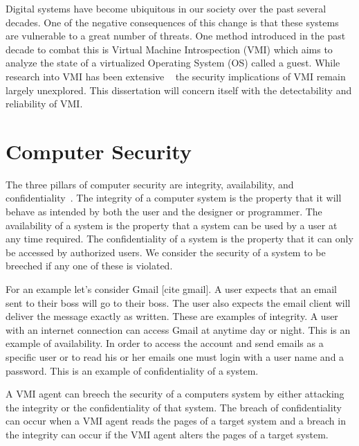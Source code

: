 
Digital systems have become ubiquitous in our society over the past several decades. One of the negative consequences of this change is that these systems are vulnerable to a great number of threats. One method introduced in the past decade to combat this is Virtual Machine Introspection (VMI) which aims to analyze the state of a virtualized Operating System (OS) called a guest. While research into VMI has been extensive ~\cite{bahram_dksm:_2010,pfoh_exploiting_2010,dolan-gavitt_leveraging_2011,dolan-gavitt_virtuoso:_2011,gu_process_2011-1,fu_bridging_2013,garfinkel_virtual_2003,hay_forensics_2008} the security implications of VMI remain largely unexplored. This dissertation will concern itself with the detectability and reliability of VMI.

\section{Computer Security}

The three pillars of computer security are integrity, availability, and confidentiality~\cite{bishop_computer_2012}.  The integrity of a computer system is the property that it will behave as intended by both the user and the designer or programmer.  The availability of a system is the property that a system can be used by a user at any time required. The confidentiality of a system is the property that it can only be accessed by authorized users.  We consider the security of a system to be breeched if any one of these is violated. 

For an example let's consider Gmail [cite gmail].  A user expects that an email sent to their boss will go to their boss. The user also expects the email client will deliver the message exactly as written. These are examples of integrity. A user with an internet connection can access Gmail at anytime day or night. This is an example of availability. In order to access the account and send emails as a specific user or to read his or her emails one must login with a user name and a password.  This is an example of confidentiality of a system. 

A VMI agent can breech the security of a computers system by either attacking the integrity or the confidentiality of that system. The breach of confidentiality can occur when a VMI agent reads the pages of a target system and a breach in the integrity can occur if the VMI agent alters the pages of a target system. 

